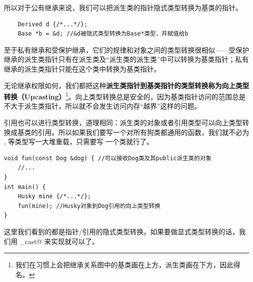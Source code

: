 所以对于公有继承来说，我们可以把派生类的指针隐式类型转换为基类的指针。
\begin{lstlisting}
    Derived d {/*...*/};
    Base *b = &d; //&d被隐式类型转换为Base*类型，并赋值给b
\end{lstlisting}\par
至于私有继承和受保护继承，它们的规律和对象之间的类型转换很相似——受保护继承的派生类指针只有在派生类及``派生类的派生类''中可以转换为基类指针；私有继承的派生类指针只能在这个类中转换为基类指针。\par
无论继承权限如何，我们都把这种\textbf{派生类指针到基类指针的类型转换称为向上类型转换（Upcasting）}\footnote{我们在习惯上会把继承关系图中的基类画在上方，派生类画在下方，因此得名。}。向上类型转换总是安全的，因为基类指针访问的范围总是不大于派生类指针，所以就不会发生访问内存``越界''这样的问题。\par
引用也可以进行类型转换，道理相同：派生类的对象或者引用类型可以向上类型转换成基类的引用。所以如果我们要写一个对所有狗类都通用的函数，我们就不必为 \lstinline@Husky@, \lstinline@Retriever@ 等类型写一大堆重载，只需要写 \lstinline@Dog@ 一个类就行了。
\begin{lstlisting}
void fun(const Dog &dog) { //可以接收Dog类及其public派生类的对象
    //...
}
int main() {
    Husky mine {/*...*/};
    fun(mine); //Husky对象到Dog引用的向上类型转换
}
\end{lstlisting}\par
这里我们看到的都是指针/引用的隐式类型转换。如果要做显式类型转换的话，我们用 \lstinline@static_cast@ 来实现就可以了。\par
